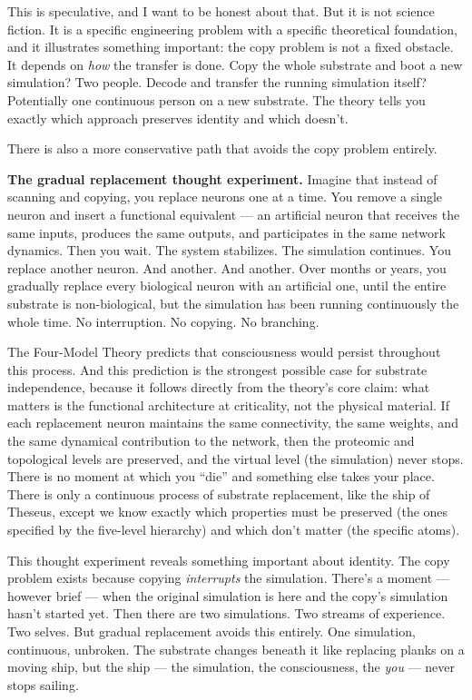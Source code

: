 \documentclass[11pt, twoside, openright]{book}
\begin{document}
This is speculative, and I want to be honest about that. But it is not science fiction. It is a specific engineering problem with a specific theoretical foundation, and it illustrates something important: the copy problem is not a fixed obstacle. It depends on \textit{how} the transfer is done. Copy the whole substrate and boot a new simulation? Two people. Decode and transfer the running simulation itself? Potentially one continuous person on a new substrate. The theory tells you exactly which approach preserves identity and which doesn't.

There is also a more conservative path that avoids the copy problem entirely.

\textbf{The gradual replacement thought experiment.} Imagine that instead of scanning and copying, you replace neurons one at a time. You remove a single neuron and insert a functional equivalent --- an artificial neuron that receives the same inputs, produces the same outputs, and participates in the same network dynamics. Then you wait. The system stabilizes. The simulation continues. You replace another neuron. And another. And another. Over months or years, you gradually replace every biological neuron with an artificial one, until the entire substrate is non-biological, but the simulation has been running continuously the whole time. No interruption. No copying. No branching.

The Four-Model Theory predicts that consciousness would persist throughout this process. And this prediction is the strongest possible case for substrate independence, because it follows directly from the theory's core claim: what matters is the functional architecture at criticality, not the physical material. If each replacement neuron maintains the same connectivity, the same weights, and the same dynamical contribution to the network, then the proteomic and topological levels are preserved, and the virtual level (the simulation) never stops. There is no moment at which you ``die'' and something else takes your place. There is only a continuous process of substrate replacement, like the ship of Theseus, except we know exactly which properties must be preserved (the ones specified by the five-level hierarchy) and which don't matter (the specific atoms).

This thought experiment reveals something important about identity. The copy problem exists because copying \textit{interrupts} the simulation. There's a moment --- however brief --- when the original simulation is here and the copy's simulation hasn't started yet. Then there are two simulations. Two streams of experience. Two selves. But gradual replacement avoids this entirely. One simulation, continuous, unbroken. The substrate changes beneath it like replacing planks on a moving ship, but the ship --- the simulation, the consciousness, the \textit{you} --- never stops sailing.
\end{document}
